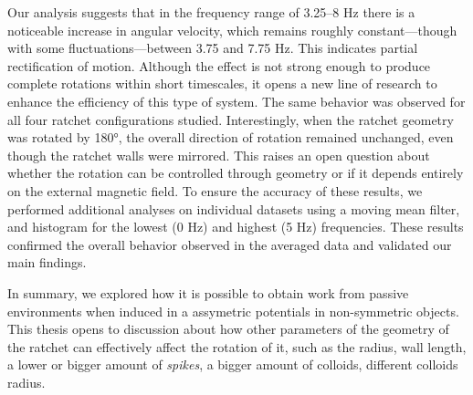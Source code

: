 Our analysis suggests that in the frequency range of 3.25–8 Hz there is a noticeable increase in angular velocity, which remains roughly constant—though with some fluctuations—between 3.75 and 7.75 Hz. This indicates partial rectification of motion. Although the effect is not strong enough to produce complete rotations within short timescales, it opens a new line of research to enhance the efficiency of this type of system. The same behavior was observed for all four ratchet configurations studied. Interestingly, when the ratchet geometry was rotated by 180°, the overall direction of rotation remained unchanged, even though the ratchet walls were mirrored. This raises an open question about whether the rotation can be controlled through geometry or if it depends entirely on the external magnetic field.
To ensure the accuracy of these results, we performed additional analyses on individual datasets using a moving mean filter, and histogram for the lowest (0 Hz) and highest (5 Hz) frequencies. These results confirmed the overall behavior observed in the averaged data and validated our main findings.

In summary, we explored how it is possible to obtain work from passive environments when induced in a assymetric potentials in non-symmetric objects. This thesis opens to discussion about how other parameters of the geometry of the ratchet can effectively affect the rotation of it, such as the radius, wall length, a lower or bigger amount of \textit{spikes}, a bigger amount of colloids, different colloids radius. 
